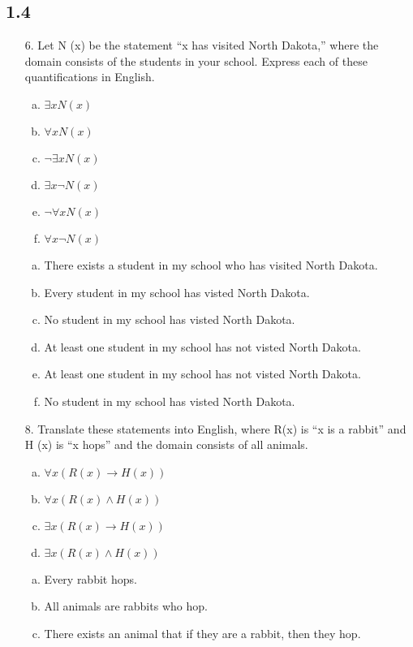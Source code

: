 \subsection{1.4}
\begin{itemize}
\item[6.] Let N (x) be the statement “x has visited North Dakota,” where
the domain consists of the students in your school. Express each of these
quantifications in English.
\begin{enumerate}[a.]
\item $\exists xN(x)$
\item $\forall xN(x)$
\item $\neg\exists xN(x)$
\item $\exists x \neg N(x)$
\item $\neg\forall xN(x)$
\item $\forall x \neg N(x)$
\end {enumerate}
\answer
\begin{enumerate}[a.]
    \item There exists a student in my school who has visited North Dakota.
    \item Every student in my school has visted North Dakota.
    \item No student in my school has visted North Dakota.
    \item At least one student in my school has not visted North Dakota.
    \item At least one student in my school has not visted North Dakota.
    \item No student in my school has visted North Dakota.
\end{enumerate}
\item[8.] Translate these statements into English, where R(x) is “x is a rabbit” and H (x) is “x hops” and the domain consists of all animals.
\begin {enumerate}[a.]
\item $\forall x(R(x) \to H(x))$
\item $\forall x(R(x) \land H(x))$
\item $\exists x(R(x) \to H(x))$
\item $\exists x(R(x) \land H(x))$
\end{enumerate}
\answer
\begin{enumerate}[a.]
    \item Every rabbit hops.
    \item All animals are rabbits who hop.
    \item There exists an animal that if they are a rabbit, then they hop.

\end{enumerate}
\end{itemize}
